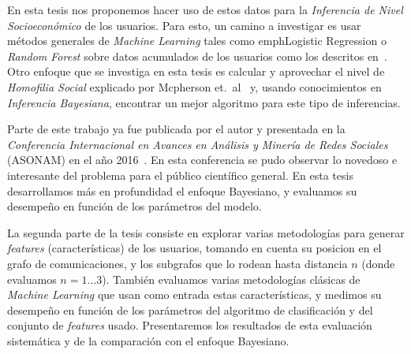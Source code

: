 \documentclass{article}
\begin{document}
En esta tesis nos proponemos hacer uso de estos datos para la \emph{Inferencia de Nivel Socioeconómico} de los usuarios. Para esto, un camino a investigar es usar métodos generales de \emph{Machine Learning} tales como emph{Logistic Regression} o \emph{Random Forest} sobre datos acumulados de los usuarios como los descritos en~\cite{oskarsdottir2016}. Otro enfoque que se investiga en esta tesis es calcular y aprovechar el nivel de \emph{Homofilia Social} explicado por Mcpherson et.\ al~\cite{mcpherson2001birds} y, usando conocimientos en \emph{Inferencia Bayesiana}, encontrar un mejor algoritmo para este tipo de inferencias.

Parte de este trabajo ya fue publicada por el autor y presentada en la \emph{Conferencia Internacional en Avances en Análisis y Minería de Redes Sociales} (ASONAM) en el año 2016~\cite{fixmanasonam2016}. En esta conferencia se pudo observar lo novedoso e interesante del problema para el público científico general.
En esta tesis desarrollamos más en profundidad el enfoque Bayesiano, y evaluamos su desempeño en función de los parámetros del modelo.

La segunda parte de la tesis consiste en explorar varias metodologías para generar \emph{features} (características) de los usuarios, tomando en cuenta su posicion en el grafo de comunicaciones, y los subgrafos que lo rodean hasta distancia $n$ (donde evaluamos $n = 1 \ldots 3$). También evaluamos varias metodologías clásicas de \emph{Machine Learning} que usan como entrada estas características, y medimos su desempeño en función de los parámetros del algoritmo de clasificación y del conjunto de \emph{features} usado. Presentaremos los resultados de esta evaluación sistemática y de la comparación con el enfoque Bayesiano.

{}
\end{document}
